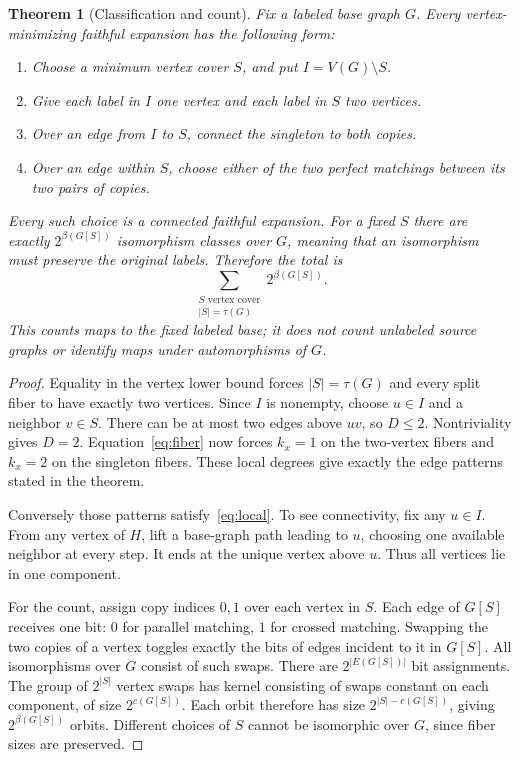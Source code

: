\documentclass[11pt]{article}
\newtheorem{theorem}{Theorem}[section]
\theoremstyle{definition}
\numberwithin{equation}{section}
\newcommand{\V}{V}
\newcommand{\E}{E}
\begin{document}
\begin{theorem}[Classification and count]\label{thm:class}
Fix a labeled base graph $G$. Every vertex-minimizing faithful expansion
has the following form:
\begin{enumerate}
\item Choose a minimum vertex cover $S$, and put $I=\V(G)\setminus S$.
\item Give each label in $I$ one vertex and each label in $S$ two vertices.
\item Over an edge from $I$ to $S$, connect the singleton to both copies.
\item Over an edge within $S$, choose either of the two perfect matchings
between its two pairs of copies.
\end{enumerate}
Every such choice is a connected faithful expansion. For a fixed $S$ there
are exactly $2^{\beta(G[S])}$ isomorphism classes \emph{over $G$}, meaning that
an isomorphism must preserve the original labels. Therefore the total is
\[
 \boxed{\sum_{\substack{S\text{ vertex cover}\\|S|=\tau(G)}}
              2^{\beta(G[S])}.}
\]
This counts maps to the fixed labeled base; it does not count unlabeled
source graphs or identify maps under automorphisms of $G$.
\end{theorem}

\begin{proof}
Equality in the vertex lower bound forces $|S|=\tau(G)$ and every split fiber
to have exactly two vertices. Since $I$ is nonempty, choose $u\in I$ and a
neighbor $v\in S$. There can be at most two edges above $uv$, so $D\le2$.
Nontriviality gives $D=2$. Equation~\eqref{eq:fiber} now forces $k_x=1$ on
the two-vertex fibers and $k_x=2$ on the singleton fibers. These local degrees
give exactly the edge patterns stated in the theorem.

Conversely those patterns satisfy~\eqref{eq:local}. To see connectivity,
fix any $u\in I$. From any vertex of $H$, lift a base-graph path leading to
$u$, choosing one available neighbor at every step. It ends at the unique
vertex above $u$. Thus all vertices lie in one component.

For the count, assign copy indices $0,1$ over each vertex in $S$. Each edge
of $G[S]$ receives one bit: $0$ for parallel matching, $1$ for crossed
matching. Swapping the two copies of a vertex toggles exactly the bits of
edges incident to it in $G[S]$. All isomorphisms over $G$ consist of such
swaps. There are $2^{|\E(G[S])|}$ bit assignments. The group of $2^{|S|}$
vertex swaps has kernel consisting of swaps constant on each component,
of size $2^{c(G[S])}$. Each orbit therefore has size
$2^{|S|-c(G[S])}$, giving $2^{\beta(G[S])}$ orbits. Different choices of $S$
cannot be isomorphic over $G$, since fiber sizes are preserved.
\end{proof}
\end{document}
